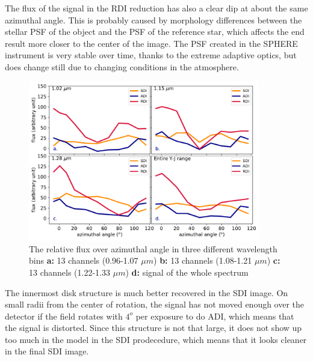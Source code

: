 \documentclass[twoside,single,12pt]{lion-msc}
\begin{document}
The flux of the signal in the RDI reduction has also a clear dip at about the same azimuthal angle. This is probably caused by morphology differences between the stellar PSF of the object and the PSF of the reference star, which affects the end result more closer to the center of the image. The PSF created in the SPHERE instrument is very stable over time, thanks to the extreme adaptive optics, but does change still due to changing conditions in the atmosphere.
\bigskip

\begin{figure}[!t]
\centering
\vspace{-0.3cm}
\includegraphics[trim={0cm 0cm 0cm 0cm},clip,width = 0.9\textwidth]{coloroverazimangle}
\caption{The relative flux over azimuthal angle in three different wavelength bins \textbf{a:} 13 channels (0.96-1.07 $\mu m$) \textbf{b:} 13 channels (1.08-1.21 $\mu m$) \textbf{c:} 13 channels (1.22-1.33 $\mu m$) \textbf{d:} signal of the whole spectrum}
\label{fig:coloroverangle}
\vspace{-0.5cm}
\end{figure}

The innermost disk structure is much better recovered in the SDI image. On small radii from the center of rotation, the signal has not moved enough over the detector if the field rotates with $4^o$ per exposure to do ADI, which means that the signal is distorted. Since this structure is not that large, it does not show up too much in the model in the SDI prodecedure, which means that it looks cleaner in the final SDI image.
\bigskip
\end{document}
